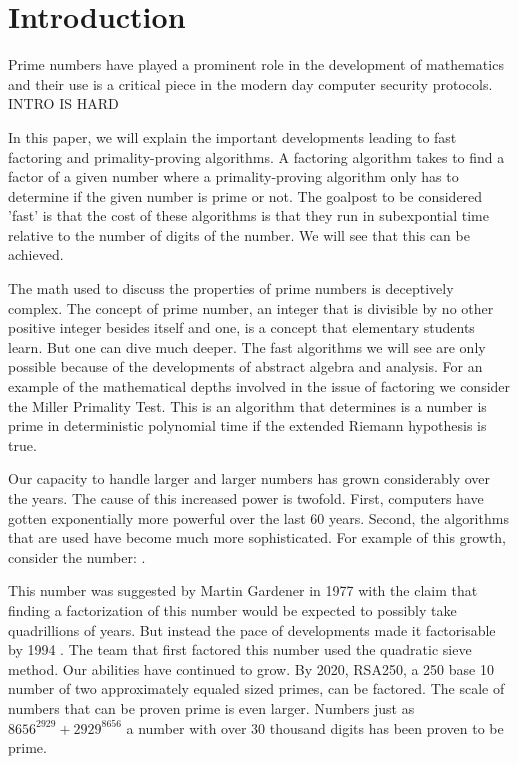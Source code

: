 \documentclass{article}
\begin{document}
\section{Introduction}
Prime numbers have played a prominent role in the development of mathematics and their use is a critical piece in the modern day computer security protocols. INTRO IS HARD 

In this paper, we will explain the important developments leading to fast factoring and primality-proving algorithms. A factoring algorithm takes to find a factor of a given number where a primality-proving algorithm only has to determine if the given number is prime or not. The goalpost to be considered 'fast' is that the cost of these algorithms is that they run in subexpontial time relative to the number of digits of the number.  We will see that this can be achieved. 

The math used to discuss the properties of prime numbers is deceptively complex. The concept of prime number, an integer that is divisible by no other positive integer besides itself and one, is a concept that elementary students learn. But one can dive much deeper. The fast algorithms we will see are only possible because of the developments of abstract algebra and  analysis. For an example of the mathematical depths involved in the issue of factoring we consider the Miller Primality Test. This is an algorithm that determines is a number is prime in deterministic polynomial time if the extended Riemann hypothesis is true.  

Our capacity to handle larger and larger numbers has grown considerably over the years. The cause of this increased power is twofold. First, computers have gotten exponentially more powerful over the last 60 years. Second, the algorithms that are used have become much more sophisticated. For example of this growth, consider the number: 
.

This number was suggested by Martin Gardener in 1977 with the claim that finding a factorization of this number would be expected to possibly take quadrillions of years\cite{garden}. But instead the pace of developments made it factorisable by 1994 \cite{atkins1994magic}. The team that first factored this number used the quadratic sieve method. Our abilities have continued to grow. By 2020, RSA250, a 250 base 10 number of two approximately equaled sized primes, can be factored. The scale of numbers that can be proven prime is even larger. Numbers just as $  8656^{2929} + 2929^{8656}$ a number with over 30 thousand digits has been proven to be prime. 
\end{document}
